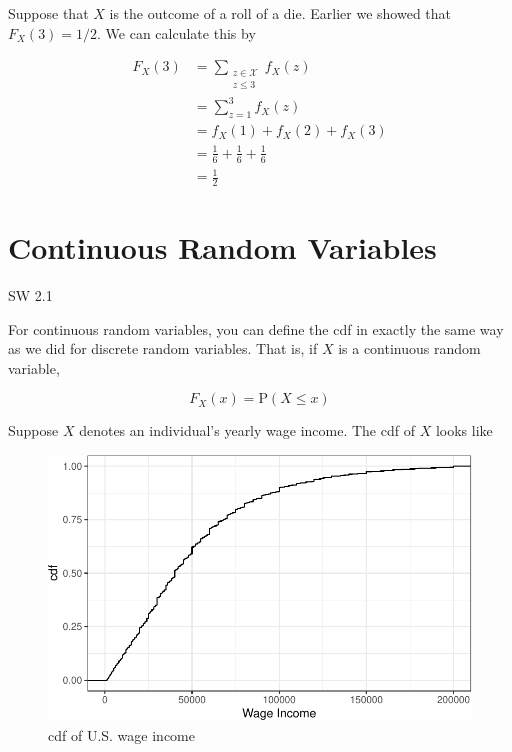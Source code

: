 \documentclass[
  letterpaper,
  DIV=11,
  numbers=noendperiod]{scrreprt}
\begin{document}
Suppose that \(X\) is the outcome of a roll of a die. Earlier we showed
that \(F_X(3) = 1/2\). We can calculate this by

\[
  \begin{aligned}
  F_X(3) &= \sum_{\substack{z \in \mathcal{X} \\ z \leq 3}} f_X(z) \\
  &= \sum_{z=1}^3 f_X(z) \\
  &= f_X(1) + f_X(2) + f_X(3) \\
  &= \frac{1}{6} + \frac{1}{6} + \frac{1}{6} \\
  &= \frac{1}{2}
  \end{aligned}
\]

\section{Continuous Random Variables}\label{continuous-random-variables}

SW 2.1

For continuous random variables, you can define the cdf in exactly the
same way as we did for discrete random variables. That is, if \(X\) is a
continuous random variable,

\[
  F_X(x) = \mathrm{P}(X \leq x)
\]

Suppose \(X\) denotes an individual's yearly wage income. The cdf of
\(X\) looks like

\begin{figure}[H]

{\centering \includegraphics{02-probability_files/figure-pdf/unnamed-chunk-5-1.pdf}

}

\caption{cdf of U.S. wage income}

\end{figure}%
\end{document}
